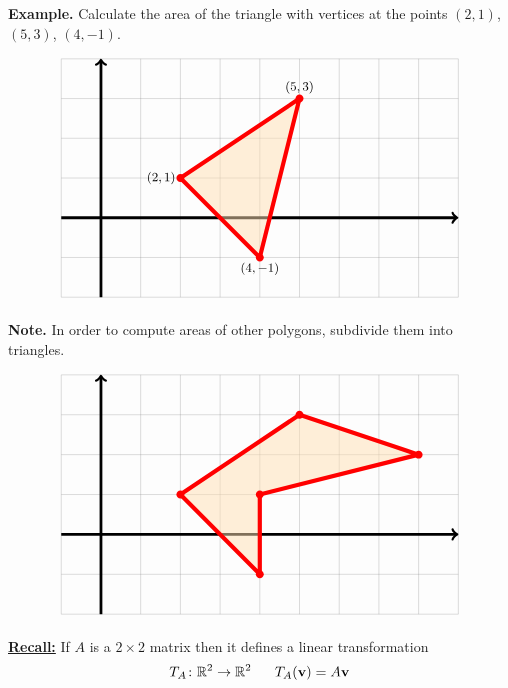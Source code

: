 {\newpage


{\bf Example.} Calculate the area of the  triangle with vertices at the points
$(2, 1)$, $(5, 3)$,  $(4, -1)$. 
\vskip 5mm

\begin{equation*}
\begin{tikzpicture}
\definecolor{MyYellow}{RGB}{255, 224, 179}
\foreach \x in {-1,...,9}{
\draw[help lines] (\x, -2) -- (\x, 4);
}
\foreach \y in {-2,...,4}{
\draw[help lines] (-1, \y) -- (9, \y);
}
\draw[->, line width = 2pt] (-1,0) -- (9,0);
\draw[->, line width = 2pt] (0,-2) -- (0,4);
\node[anchor =  east] at (2,1) {\small $(2,1)$};
\node[anchor =  south] at (5,3) {\small $(5,3)$};
\node[anchor =  north] at (4,-1) {\small $(4,-1)$};
\fill[MyYellow, opacity = 0.5] (2, 1) -- (5, 3)  -- (4, -1) -- cycle;
\foreach \x/\y in {2/1, 5/3, 4/-1}{
\fill[red] (\x, \y) circle (0.1);
}
\draw[red,  line width=3, line join=bevel] (2, 1) -- (5, 3)  -- (4, -1) -- cycle;
\end{tikzpicture} 
\end{equation*}

\newpage



{\bf Note.}  In order to compute areas of other polygons, subdivide them 
into triangles.
\vskip 5mm

\begin{equation*}
\begin{tikzpicture}
\definecolor{MyYellow}{RGB}{255, 224, 179}
\foreach \x in {-1,...,9}{
\draw[help lines] (\x, -2) -- (\x, 4);
}
\foreach \y in {-2,...,4}{
\draw[help lines] (-1, \y) -- (9, \y);
}
\draw[->, line width = 2pt] (-1,0) -- (9,0);
\draw[->, line width = 2pt] (0,-2) -- (0,4);
\fill[MyYellow, opacity = 0.5] (2, 1) -- (5, 3) -- (8, 2)-- (4, 1) -- (4, -1) -- cycle;
\foreach \x/\y in {2/1, 5/3, 8/2, 4/1, 4/-1}{
\fill[red] (\x, \y) circle (0.1);
}
\draw[red,  line width=3, line join=bevel] (2, 1) -- (5, 3)  -- (8, 2)-- (4, 1) -- (4, -1) -- cycle;
\end{tikzpicture} 
\end{equation*}

\newpage






\underline{\bf Recall:} If $A$ is a $2\times 2$ matrix then it defines a linear transformation
$$T_{A}\colon \R^{2} \to \R^{2} \ \ \ \ \ T_{A}(\vv) = A\vv$$


}
